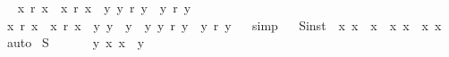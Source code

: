 \begin{isabellebody}
\ \isanewline
{}\isamarkupfalse%
\ {\isachardoublequoteopen}{\isacharparenleft}x\ \isactrlbold r\ x\ \isactrlbold {\isasymrightarrow}\ x\ \isactrlbold r\ x{\isacharparenright}\ \isactrlbold {\isasymrightarrow}\ {\isacharparenleft}\isactrlbold {\isasymexists}y{\isachardot}\ y\ \isactrlbold r\ y\ \isactrlbold {\isasymrightarrow}\ y\ \isactrlbold r\ y{\isacharparenright}{\isachardoublequoteclose}\ \isamarkupfalse%
%
\isadelimproof
\ %
\endisadelimproof
%
\isatagproof
{}\isamarkupfalse%
%
\endisatagproof
{\isafoldproof}%
%
\isadelimproof
%
\endisadelimproof
\isanewline
\ \isanewline
{}\isamarkupfalse%
\ {\isachardoublequoteopen}{\isacharparenleft}{\isacharparenleft}x\ \isactrlbold r\ x\ \isactrlbold {\isasymrightarrow}\ x\ \isactrlbold r\ x{\isacharparenright}\ \isactrlbold {\isasymand}\ {\isacharparenleft}\isactrlbold {\isasymexists}y{\isacharcolon}{\isacharcolon}{\isasymiota}{\isachardot}\ y\ \isactrlbold {\isacharequal}\ y{\isacharparenright}{\isacharparenright}\ \isactrlbold {\isasymrightarrow}\ {\isacharparenleft}\isactrlbold {\isasymexists}y{\isachardot}\ y\ \isactrlbold r\ y\ \isactrlbold {\isasymrightarrow}\ y\ \isactrlbold r\ y{\isacharparenright}{\isachardoublequoteclose}%
\isadelimproof
\ %
\endisadelimproof
%
\isatagproof
{}\isamarkupfalse%
\ simp\isanewline
\ \isanewline
\isanewline
\isanewline
%
%
\endisatagproof
{\isafoldproof}%
%
\isadelimproof
%
\endisadelimproof
\isanewline
{}\isamarkupfalse%
\ S{}{\isacharunderscore}inst\ {\isacharcolon}\ {\isachardoublequoteopen}{\isacharparenleft}\isactrlbold {\isasymforall}x{\isachardot}\ {\isasymPhi}{\isacharparenleft}x{\isacharparenright}\ \isactrlbold {\isasymrightarrow}\ {\isasymPsi}{\isacharparenleft}x{\isacharparenright}{\isacharparenright}\ \isactrlbold {\isasymrightarrow}\ {\isacharparenleft}{\isacharparenleft}\isactrlbold {\isasymforall}x{\isachardot}\ {\isasymPhi}{\isacharparenleft}x{\isacharparenright}{\isacharparenright}\ \isactrlbold {\isasymrightarrow}\ {\isacharparenleft}\isactrlbold {\isasymforall}x{\isachardot}\ {\isasymPsi}{\isacharparenleft}x{\isacharparenright}{\isacharparenright}{\isacharparenright}{\isachardoublequoteclose}%
\isadelimproof
\ %
\endisadelimproof
%
\isatagproof
{}\isamarkupfalse%
\ auto%
\endisatagproof
{\isafoldproof}%
%
\isadelimproof
%
\endisadelimproof
\isanewline
{}\isamarkupfalse%
\ S{}\ {\isacharcolon}\ \ \ \ \ \ {\isachardoublequoteopen}\isactrlbold {\isasymforall}y{\isachardot}\ \isactrlbold {\isasymexists}x{\isachardot}\ x\ \isactrlbold {\isacharequal}\ y{\isachardoublequoteclose}%

\end{isabellebody}
